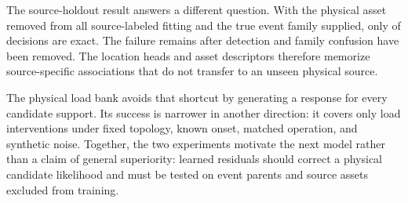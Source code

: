 The source-holdout result answers a different question. With the physical asset removed from all source-labeled fitting and the true event family supplied, only \HeldSourceCorrect{} of \HeldSourceDecisions{} decisions are exact. The failure remains after detection and family confusion have been removed. The location heads and asset descriptors therefore memorize source-specific associations that do not transfer to an unseen physical source.

The physical load bank avoids that shortcut by generating a response for every candidate support. Its success is narrower in another direction: it covers only load interventions under fixed topology, known onset, matched operation, and synthetic noise. Together, the two experiments motivate the next model rather than a claim of general superiority: learned residuals should correct a physical candidate likelihood and must be tested on event parents and source assets excluded from training.
